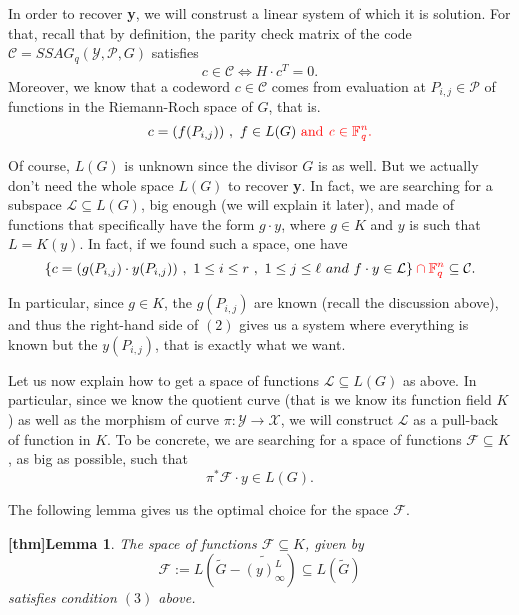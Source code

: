 \documentclass[10pt]{article}
\newtheorem{lem1}{[thm]Lemma}
\newcommand{\s}{\vspace{0.3cm}}
\newcommand{\cd}{\cdot}
\newcommand{\fq}{\mathbb{F}_q}
\newcommand{\su}{\subseteq}
\newcommand{\X}{\mathcal{X}}
\newcommand{\Y}{\mathcal{Y}}
\newcommand{\PR}{\mathcal{P}}
\begin{document}
\s

In order to recover \textbf{y}, we will construst a linear system of which it is solution. For that, recall that by definition, the parity check matrix of the code $\mathcal{C}=SSAG_q(\Y,\PR,G)$ satisfies
\begin{equation}
c \in \mathcal{C} \iff H \cd c^T = 0.
\end{equation}
Moreover, we know that a codeword $c \in \mathcal{C}$ comes from evaluation at $P_{i,j} \in \PR$ of functions in the Riemann-Roch space of $G$, that is.
\[c = (f(P_{i,j})) \ , \ f \in L(G) \ \rm \color{red} and \ \it c \in \fq^n. \color{black}\]

Of course, $L(G)$ is unknown since the divisor $G$ is as well. But we actually don't need the whole space $L(G)$ to recover \textbf{y}. In fact, we are searching for a subspace $\mathcal{L} \su L(G)$, big enough (we will explain it later), and made of functions that specifically have the form $g \cd y$, where $g \in K$ and $y$ is such that $L=K(y)$. In fact, if we found such a space, one have 
\[\{c= (g(P_{i,j}) \cd y(P_{i,j})) \ , \ 1 \leq i \leq r \ , \ 1 \leq j \leq \ell \ and \ f\cd y \in \mathcal{L}\} \color{red} \cap \fq^n \color{black} \su \mathcal{C}.\] 

In particular, since $g \in K$, the $g(P_{i,j})$ are known (recall the discussion above), and thus the right-hand side of $(2)$ gives us a system where everything is known but the $y(P_{i,j})$, that is exactly what we want.

\s

Let us now explain how to get a space of functions $\mathcal{L} \su L(G)$ as above. In particular, since we know the quotient curve (that is we know its function field $K$) as well as the morphism of curve $\pi : \Y \rightarrow \X$, we will construct $\mathcal{L}$ as a pull-back of function in $K$. To be concrete, we are searching for a space of functions $\mathcal{F} \su K$, as big as possible, such that 
\begin{equation}
\pi^*\mathcal{F} \cd y \in L(G). 
\end{equation}

The following lemma gives us the optimal choice for the space $\mathcal{F}$.

\s

\begin{lem1} \label{constructionD}
The space of functions $\mathcal{F} \su K$, given by 
\[\mathcal{F} := L\left(\widetilde{G}-\widetilde{(y)^L_{\infty}}\right) \su L(\tilde{G})\]
satisfies condition $(3)$ above.
\end{lem1}
\end{document}
